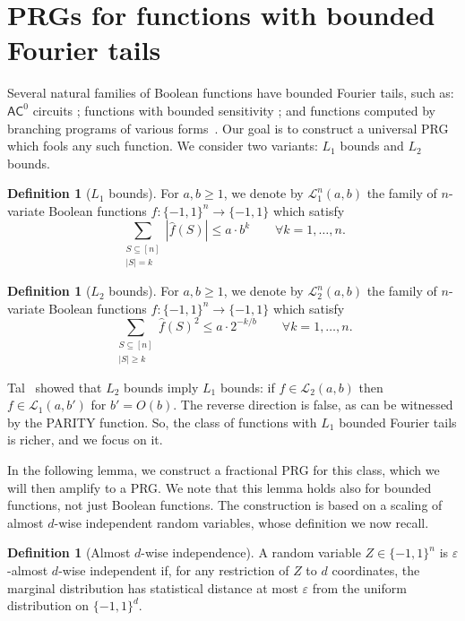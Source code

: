 \documentclass[11pt]{article}
\numberwithin{equation}{section}
\theoremstyle{definition}
\newtheorem{definition}[theorem]{Definition}
\theoremstyle{plain}
\newcommand{\cclass}[1]{\textsf{#1}}
\newcommand{\LL}{\mathcal{L}}
\newcommand{\eps}{\varepsilon}
\begin{document}
\section{PRGs for functions with bounded Fourier tails}
\label{sec:spectral}

Several natural families of Boolean functions have bounded Fourier tails, such as: $\cclass{AC}^0$ circuits \cite{linial1993constant,mansour1995nlog}; functions
with bounded sensitivity \cite{gopalan2016degree,lovett2016robust}; and
functions computed by branching programs of various forms~\cite{reingold2013pseudorandomness,chattopadhyay2018improved}.
Our goal is to construct a universal PRG which fools any such function. We consider two variants: $L_1$ bounds and $L_2$ bounds.

\begin{definition}[$L_1$ bounds]
For $a,b \ge 1$, we denote by $\LL_1^n(a,b)$ the family of $n$-variate Boolean functions $f:\{-1,1\}^n \to \{-1,1\}$ which satisfy
$$
\sum_{\substack{S\subseteq [n] \\ |S| = k }} |\widehat{f}(S)| \leq a \cdot b^k \qquad \forall k=1,\ldots,n.
$$
\end{definition}

\begin{definition}[$L_2$ bounds]
For $a,b \ge 1$, we denote by $\LL_2^n(a,b)$ the family of $n$-variate Boolean functions $f:\{-1,1\}^n \to \{-1,1\}$ which satisfy
$$
\sum_{\substack{S\subseteq [n] \\ |S| \ge k }} \widehat{f}(S)^2 \leq a \cdot 2^{-k/b} \qquad \forall k=1,\ldots,n.
$$
\end{definition}

Tal~\cite{tal2017tight} showed that $L_2$ bounds imply $L_1$ bounds: if $f \in \LL_2(a,b)$ then $f \in \LL_1(a,b')$ for $b'=O(b)$.
The reverse direction is false, as can be witnessed by the PARITY function.
So, the class of functions with $L_1$ bounded Fourier tails is richer, and we focus on it.

In the following lemma, we construct a fractional PRG for this class, which we will then amplify to a PRG\@.
We note that this lemma holds also for bounded functions, not just Boolean functions.
The construction is based on a scaling of almost $d$-wise independent random variables, whose definition we now recall.

\begin{definition}[Almost $d$-wise independence]
A random variable $Z \in \{-1,1\}^n$ is $\eps$-almost $d$-wise independent if,
for any restriction of $Z$ to $d$ coordinates,
the marginal distribution has statistical distance at
most $\eps$ from the uniform distribution on $\{-1,1\}^d$.
\end{definition}
\end{document}
